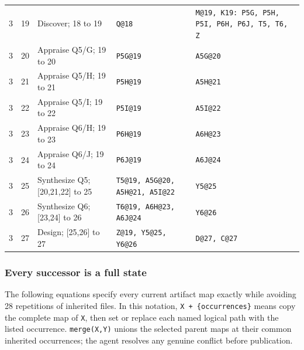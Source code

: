 \documentclass[11pt]{article}
\begin{document}
{\begin{longtable}{@{}L{0.28in}L{0.48in}L{1.42in}L{1.45in}L{2.16in}@{}}
3 & 19 & Discover; 18 to 19 & \texttt{Q@18} & \texttt{M@19, K19: P5G, P5H, P5I, P6H, P6J, T5, T6, Z} \\
3 & 20 & Appraise Q5/G; 19 to 20 & \texttt{P5G@19} & \texttt{A5G@20} \\
3 & 21 & Appraise Q5/H; 19 to 21 & \texttt{P5H@19} & \texttt{A5H@21} \\
3 & 22 & Appraise Q5/I; 19 to 22 & \texttt{P5I@19} & \texttt{A5I@22} \\
3 & 23 & Appraise Q6/H; 19 to 23 & \texttt{P6H@19} & \texttt{A6H@23} \\
3 & 24 & Appraise Q6/J; 19 to 24 & \texttt{P6J@19} & \texttt{A6J@24} \\
3 & 25 & Synthesize Q5; [20,21,22] to 25 & \texttt{T5@19, A5G@20, A5H@21, A5I@22} & \texttt{Y5@25} \\
3 & 26 & Synthesize Q6; [23,24] to 26 & \texttt{T6@19, A6H@23, A6J@24} & \texttt{Y6@26} \\
3 & 27 & Design; [25,26] to 27 & \texttt{Z@19, Y5@25, Y6@26} & \texttt{D@27, C@27} \\
\bottomrule
\end{longtable}
}

\subsubsection{Every successor is a full state}

The following equations specify every current artifact map exactly while
avoiding 28 repetitions of inherited files. In this notation,
\texttt{X + \{occurrences\}} means copy the complete map of \texttt{X}, then
set or replace each named logical path with the listed occurrence.
\texttt{merge(X,Y)} unions the selected parent maps at their common inherited
occurrences; the agent resolves any genuine conflict before publication.
\end{document}
